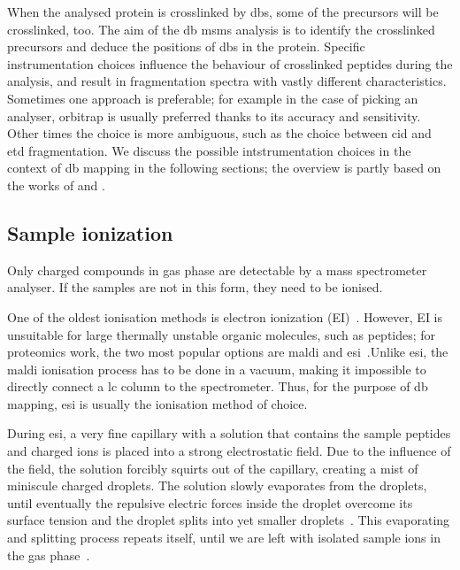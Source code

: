 When the analysed protein is crosslinked by \glspl*{db}, some of the precursors will be crosslinked, too. The aim of the \gls*{db} \gls*{msms} analysis is to identify the crosslinked precursors and deduce the positions of \glspl*{db} in the protein. Specific instrumentation choices influence the behaviour of crosslinked peptides during the analysis, and result in fragmentation spectra with vastly different characteristics. Sometimes one approach is preferable; for example in the case of picking an analyser, orbitrap is usually preferred thanks to its accuracy and sensitivity. Other times the choice is more ambiguous, such as the choice between \gls*{cid} and \gls*{etd} fragmentation. We discuss the possible intstrumentation choices in the context of \gls*{db} mapping in the following sections; the overview is partly based on the works of \citet{matthiesen2007mass} and \citet{gross2006mass}.

\subsection{Sample ionization}\label{sec:ionisation}

Only charged compounds in gas phase are detectable by a mass spectrometer analyser. If the samples are not in this form, they need to be ionised.

One of the oldest ionisation methods is electron ionization (EI)~\cite{field2013electron}. However, EI is unsuitable for large thermally unstable organic molecules, such as peptides; for proteomics work, the two most popular options are \gls*{maldi} and \gls*{esi}~\cite{caprioli1997molecular, fenn1990electrospray}.\@ Unlike \gls*{esi}, the \gls*{maldi} ionisation process has to be done in a vacuum, making it impossible to directly connect a \gls*{lc} column to the spectrometer. Thus, for the purpose of \gls*{db} mapping, \gls*{esi} is usually the ionisation method of choice.

During \gls*{esi}, a very fine capillary with a solution that contains the sample peptides and charged ions is placed into a strong electrostatic field. Due to the influence of the field, the solution forcibly squirts out of the capillary, creating a mist of miniscule charged droplets. The solution slowly evaporates from the droplets, until eventually the repulsive electric forces inside the droplet overcome its surface tension and the droplet splits into yet smaller droplets~\cite{rayleigh1882xx}. This evaporating and splitting process repeats itself, until we are left with isolated sample ions in the gas phase~\cite{dole1968molecular,dole1968gas,fenn1989electrospray, fenn1990electrospray}.

